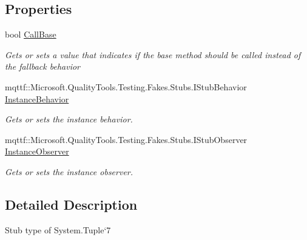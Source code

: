 \subsection*{Properties}
\begin{DoxyCompactItemize}
\item 
bool \hyperlink{class_system_1_1_fakes_1_1_stub_tuple_3_01_t1_00_01_t2_00_01_t3_00_01_t4_00_01_t5_00_01_t6_00_01_t7_01_4_a4f23499691a154c6c92780c1f8fb521b}{Call\-Base}
\begin{DoxyCompactList}\small\item\em Gets or sets a value that indicates if the base method should be called instead of the fallback behavior\end{DoxyCompactList}\item 
mqttf\-::\-Microsoft.\-Quality\-Tools.\-Testing.\-Fakes.\-Stubs.\-I\-Stub\-Behavior \hyperlink{class_system_1_1_fakes_1_1_stub_tuple_3_01_t1_00_01_t2_00_01_t3_00_01_t4_00_01_t5_00_01_t6_00_01_t7_01_4_a1a07f09c2bd61827f428c483d1ddc1af}{Instance\-Behavior}
\begin{DoxyCompactList}\small\item\em Gets or sets the instance behavior.\end{DoxyCompactList}\item 
mqttf\-::\-Microsoft.\-Quality\-Tools.\-Testing.\-Fakes.\-Stubs.\-I\-Stub\-Observer \hyperlink{class_system_1_1_fakes_1_1_stub_tuple_3_01_t1_00_01_t2_00_01_t3_00_01_t4_00_01_t5_00_01_t6_00_01_t7_01_4_ab126e7555230d832bdd3b30b7168b858}{Instance\-Observer}
\begin{DoxyCompactList}\small\item\em Gets or sets the instance observer.\end{DoxyCompactList}\end{DoxyCompactItemize}


\subsection{Detailed Description}
Stub type of System.\-Tuple`7



